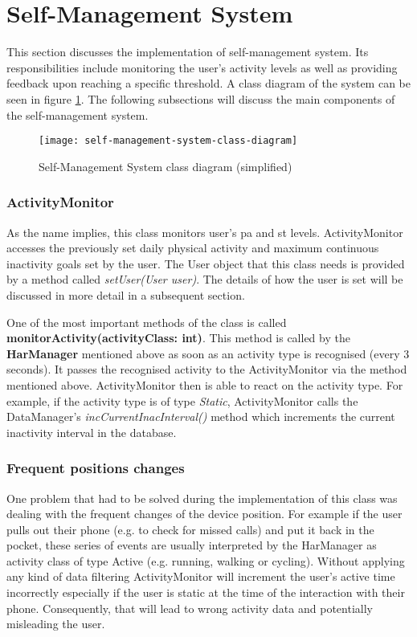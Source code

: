         
\section{Self-Management System}
This section discusses the implementation of self-management system. Its responsibilities include monitoring the user's activity levels as well as providing feedback upon reaching a specific threshold. A class diagram of the system can be seen in figure \ref{fig:self_management_system}. The following subsections will discuss the main components of the self-management system. 

\begin{figure}[ht]
    \centering
    \texttt{[image: self-management-system-class-diagram]}
    \caption{Self-Management System class diagram (simplified)}
    \label{fig:self_management_system}
\end{figure}

    \subsubsection{ActivityMonitor}
    \label{section:activity-monitor}
    As the name implies, this class monitors user's \gls{pa} and \gls{st} levels. ActivityMonitor accesses the previously set daily physical activity and maximum continuous inactivity goals set by the user. The User object that this class needs is provided by a method called \textit{setUser(User user)}. The details of how the user is set will be discussed in more detail in a subsequent section.
    
    One of the most important methods of the class is called \textbf{monitorActivity(activityClass: int)}. This method is called by the \textbf{HarManager} mentioned above as soon as an activity type is recognised (every 3 seconds). It passes the recognised activity to the ActivityMonitor via the method mentioned above. ActivityMonitor then is able to react on the activity type. For example, if the activity type is of type \textit{Static}, ActivityMonitor calls the DataManager's \textit{incCurrentInacInterval()} method which increments the current inactivity interval in the database.
    
    \subsubsection{Frequent positions changes}
    One problem that had to be solved during the implementation of this class was dealing with the frequent changes of the device position. For example if the user pulls out their phone (e.g. to check for missed calls) and put it back in the pocket, these series of events are usually interpreted by the HarManager as activity class of type Active (e.g. running, walking or cycling). Without applying any kind of data filtering ActivityMonitor will increment the user's active time incorrectly especially if the user is static at the time of the interaction with their phone. Consequently, that will lead to wrong activity data and potentially misleading the user.
    
